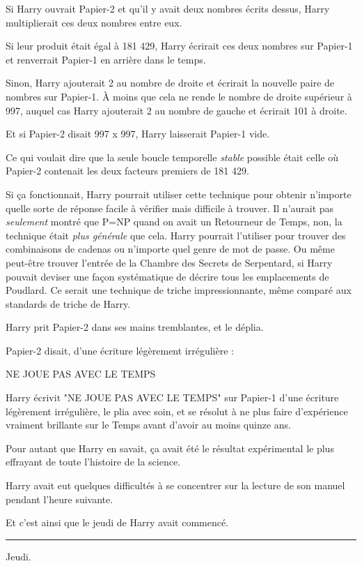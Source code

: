 Si Harry ouvrait Papier-2 et qu'il y avait deux nombres écrits dessus, Harry multiplierait ces deux nombres entre eux.

Si leur produit était égal à 181 429, Harry écrirait ces deux nombres sur Papier-1 et renverrait Papier-1 en arrière dans le temps.

Sinon, Harry ajouterait 2 au nombre de droite et écrirait la nouvelle paire de nombres sur Papier-1. À moins que cela ne rende le nombre de droite supérieur à 997, auquel cas Harry ajouterait 2 au nombre de gauche et écrirait 101 à droite.

Et si Papier-2 disait 997 x 997, Harry laisserait Papier-1 vide.

Ce qui voulait dire que la seule boucle temporelle \emph{stable}  possible était celle où Papier-2 contenait les deux facteurs premiers de 181 429.

Si ça fonctionnait, Harry pourrait utiliser cette technique pour obtenir n'importe quelle sorte de réponse facile à vérifier mais difficile à trouver. Il n'aurait pas \emph{seulement}  montré que P=NP quand on avait un Retourneur de Temps, non, la technique était \emph{plus générale}  que cela. Harry pourrait l'utiliser pour trouver des combinaisons de cadenas ou n'importe quel genre de mot de passe. Ou même peut-être trouver l'entrée de la Chambre des Secrets de Serpentard, si Harry pouvait deviser une façon systématique de décrire tous les emplacements de Poudlard. Ce serait une technique de triche impressionnante, même comparé aux standards de triche de Harry.

Harry prit Papier-2 dans ses mains tremblantes, et le déplia.

Papier-2 disait, d'une écriture légèrement irrégulière :

NE JOUE PAS AVEC LE TEMPS

Harry écrivit "NE JOUE PAS AVEC LE TEMPS" sur Papier-1 d'une écriture légèrement irrégulière, le plia avec soin, et se résolut à ne plus faire d'expérience vraiment brillante sur le Temps avant d'avoir au moins quinze ans.

Pour autant que Harry en savait, ça avait été le résultat expérimental le plus effrayant de toute l'histoire de la science.

Harry avait eut quelques difficultés à se concentrer sur la lecture de son manuel pendant l'heure suivante.

Et c'est ainsi que le jeudi de Harry avait commencé.
\par\noindent\rule{\textwidth}{0.4pt}
Jeudi.

